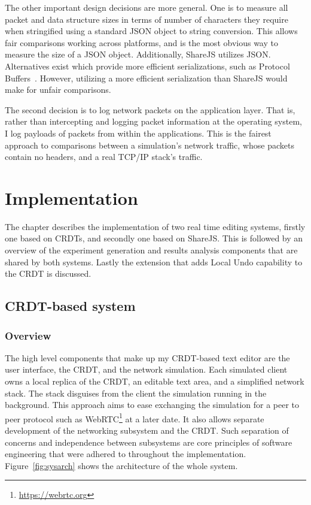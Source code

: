 \documentclass[12pt,a4paper,twoside,openright]{report}
\begin{document}
	
	The other important design decisions are more general. One is to measure all packet and data structure sizes in terms of number of characters they require when stringified using a standard JSON object to string conversion. This allows fair comparisons working across platforms, and is the most obvious way to measure the size of a JSON object. Additionally, ShareJS utilizes JSON. Alternatives exist which provide more efficient serializations, such as Protocol Buffers~\cite{protobuf}. However, utilizing a more efficient serialization than ShareJS would make for unfair comparisons.
	
	The second decision is to log network packets on the application layer. That is, rather than intercepting and logging packet information at the operating system, I log payloads of packets from within the applications. This is the fairest approach to comparisons between a simulation's network traffic, whose packets contain no headers, and a real TCP/IP stack's traffic.



\chapter{Implementation} \label{sec:implementation}

The chapter describes the implementation of two real time editing systems, firstly one based on CRDTs, and secondly one based on ShareJS. This is followed by an overview of the experiment generation and results analysis components that are shared by both systems. Lastly the extension that adds Local Undo capability to the CRDT is discussed.


\section{CRDT-based system} \label{sec:crdt}

	\subsection{Overview}
	The high level components that make up my CRDT-based text editor are the user interface, the CRDT, and the network simulation. Each simulated client owns a local replica of the CRDT, an editable text area, and a simplified network stack. The stack disguises from the client the simulation running in the background. This approach aims to ease exchanging the simulation for a peer to peer protocol such as WebRTC\footnote{\url{https://webrtc.org}} at a later date. It also allows separate development of the networking subsystem and the CRDT. Such separation of concerns and independence between subsystems are core principles of software engineering that were adhered to throughout the implementation. Figure~\ref{fig:sysarch} shows the architecture of the whole system. 
	
\end{document}
